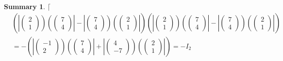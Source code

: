 \documentclass[aps,preprint]{revtex4}
\newtheorem{summary}[theorem]{Summary}
\begin{document}
\begin{summary}
$\lceil $%
\begin{align}
& \left( \left\vert \left( 
\begin{array}{c}
2 \\ 
1%
\end{array}%
\right) \right) \left( \left( 
\begin{array}{c}
7 \\ 
4%
\end{array}%
\right) \right\vert -\left\vert \left( 
\begin{array}{c}
7 \\ 
4%
\end{array}%
\right) \right) \left( \left( 
\begin{array}{c}
2 \\ 
1%
\end{array}%
\right) \right\vert \right) \left( \left\vert \left( 
\begin{array}{c}
2 \\ 
1%
\end{array}%
\right) \right) \left( \left( 
\begin{array}{c}
7 \\ 
4%
\end{array}%
\right) \right\vert -\left\vert \left( 
\begin{array}{c}
7 \\ 
4%
\end{array}%
\right) \right) \left( \left( 
\begin{array}{c}
2 \\ 
1%
\end{array}%
\right) \right\vert \right) \\
& =-\left( \left\vert \left( 
\begin{array}{c}
-1 \\ 
2%
\end{array}%
\right) \right) \left( \left( 
\begin{array}{c}
7 \\ 
4%
\end{array}%
\right) \right\vert +\left\vert \left( 
\begin{array}{c}
4 \\ 
-7%
\end{array}%
\right) \right) \left( \left( 
\begin{array}{c}
2 \\ 
1%
\end{array}%
\right) \right\vert \right) =-I_{2}
\end{align}%
\begin{align}

\end{align}
\end{summary}
\end{document}
